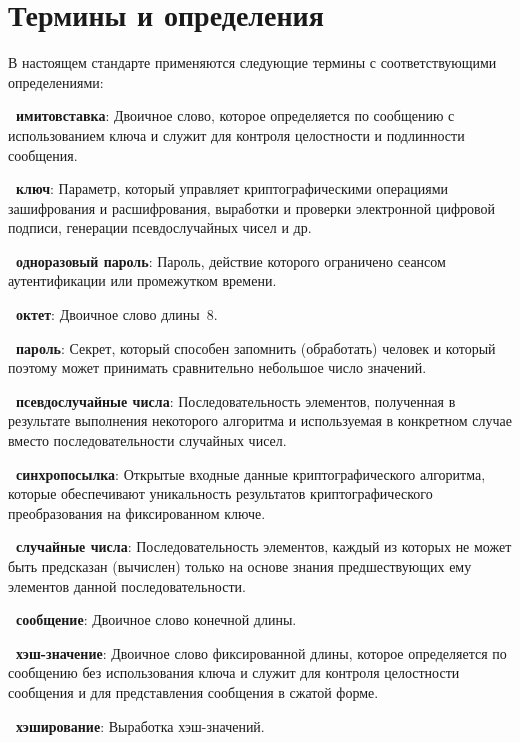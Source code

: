 \chapter{Термины и определения}

В настоящем стандарте применяются  
следующие термины с соответствующими определениями:

{\bf \thedefctr~имитовставка}:
Двоичное слово, 
которое определяется по сообщению с использованием ключа 
и служит для контроля целостности и подлинности сообщения.

{\bf \thedefctr~ключ}:
Параметр, который управляет криптографическими 
операциями зашифрования и расшифрования, 
выработки и проверки электронной цифровой подписи, 
генерации псевдослучайных чисел и др.

{\bf \thedefctr~одноразовый пароль}:
Пароль, действие которого ограничено сеансом 
аутентификации или промежутком времени.

{\bf \thedefctr~октет}:
Двоичное слово длины~$8$.

{\bf \thedefctr~пароль}:
Секрет, который способен запомнить (обработать) 
человек и который поэтому может принимать сравнительно небольшое 
число значений.

{\bf \thedefctr~псевдослучайные числа}:
Последовательность элементов, полученная в результате выполнения 
некоторого алгоритма и используемая в конкретном случае 
вместо последовательности случайных чисел.
%

{\bf \thedefctr~синхропосылка}:
Открытые входные данные криптографического алгоритма,
которые обеспечивают уникальность результатов 
криптографического преобразования на фиксированном ключе.

{\bf \thedefctr~случайные числа}:
Последовательность элементов, каждый из которых не может быть предсказан
(вычислен) только на основе знания предшествующих 
ему элементов данной последовательности.
%


{\bf \thedefctr~сообщение}:
Двоичное слово конечной длины.

{\bf \thedefctr~хэш-значение}:
Двоичное слово фиксированной длины, 
которое определяется по сообщению без использования ключа и 
служит для контроля целостности сообщения и для представления 
сообщения в сжатой форме.

{\bf \thedefctr~хэширование}:
Выработка хэш-значений.

